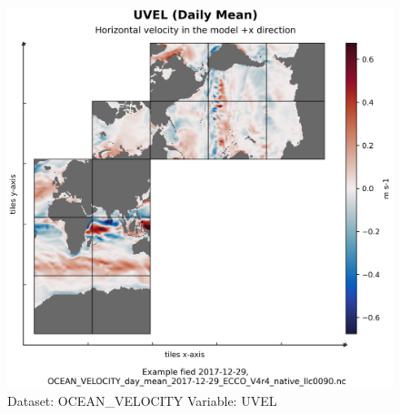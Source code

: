 \begin{longtable}{|m{}|m{}|m{}|m{}|}
\end{longtable}

\begin{figure}[H]
\centering
\includegraphics[scale=0.55]{../images/plots/native_plots/Ocean_Velocity/UVEL.png}
\caption{Dataset: OCEAN\_VELOCITY Variable: UVEL}
\label{tab:table-OCEAN_VELOCITY_UVEL-Plot}
\end{figure}
\pagebreak
